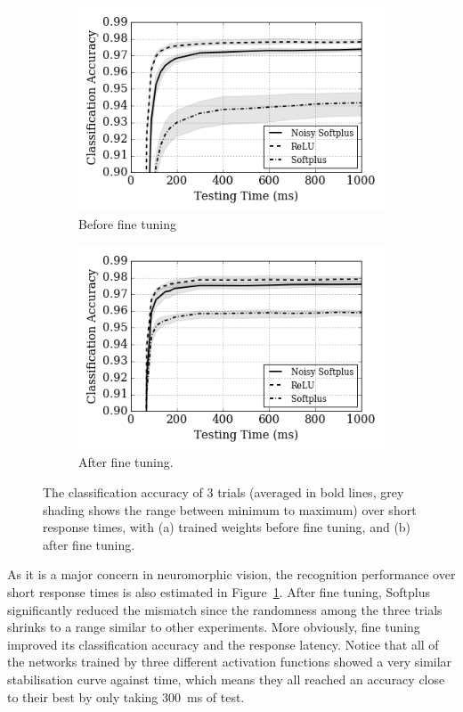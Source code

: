 \documentclass[runningheads,a4paper]{llncs}
\begin{document}
\begin{figure}[htb!]
	\centering
	\begin{subfigure}[t]{0.49\textwidth}
		\includegraphics[width=\textwidth]{8-2.png}
		\caption{Before fine tuning}
	\end{subfigure}
	\begin{subfigure}[t]{0.49\textwidth}
		\includegraphics[width=\textwidth]{8-3.png}
		\caption{After fine tuning.}
	\end{subfigure}
	
	\caption{The classification accuracy of 3 trials (averaged in bold lines, grey shading shows the range between minimum to maximum) over short response times, with (a) trained weights before fine tuning, and (b) after fine tuning.}
	\label{fig:ca_time}	
\end{figure}

As it is a major concern in neuromorphic vision, the recognition performance over short response times is also estimated in Figure~\ref{fig:ca_time}.
After fine tuning, Softplus significantly reduced the mismatch since the randomness among the three trials shrinks to a range similar to other experiments.
More obviously, fine tuning improved its classification accuracy and the response latency.
Notice that all of the networks trained by three different activation functions showed a very similar stabilisation curve against time, which means they all reached an accuracy close to their best by only taking 300~ms of test. 
\end{document}
